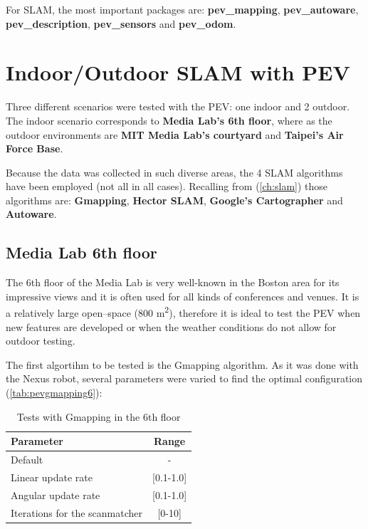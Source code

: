 For SLAM, the most important packages are: \textbf{pev\_mapping}, \textbf{pev\_autoware}, \textbf{pev\_description}, \textbf{pev\_sensors} and \textbf{pev\_odom}.

\section{Indoor/Outdoor SLAM with PEV}

Three different scenarios were tested with the PEV: one indoor and 2 outdoor. The indoor scenario corresponds to \textbf{Media Lab's 6th floor}, where as the outdoor environments are \textbf{MIT Media Lab's courtyard} and \textbf{Taipei's Air Force Base}.

Because the data was collected in such diverse areas, the 4 SLAM algorithms have been employed (not all in all cases). Recalling from (\autoref{ch:slam}) those algorithms are: \textbf{Gmapping}, \textbf{Hector SLAM}, \textbf{Google's Cartographer} and \textbf{Autoware}.

\subsection{Media Lab 6th floor}
The 6th floor of the Media Lab is very well-known in the Boston area for its impressive views and it is often used for all kinds of conferences and venues. It is a relatively large open--space (800 m\textsuperscript{2}), therefore it is ideal to test the PEV when new features are developed or when the weather conditions do not allow for outdoor testing.

The first algortihm to be tested is the Gmapping algorithm. As it was done with the Nexus robot, several parameters were varied to find the optimal configuration (\autoref{tab:pevgmapping6}):
\begin{table}[h]
  \centering
  \begin{tabular}{lc}
  \hline
  \textbf{Parameter} & \textbf{Range} \\ \hline
  Default & - \\ \hline
  Linear update rate & {[}0.1-1.0{]} \\ \hline
  Angular update rate & {[}0.1-1.0{]} \\ \hline
  Iterations for the scanmatcher & {[}0-10{]} \\ \hline
  \end{tabular}
  \caption{Tests with Gmapping in the 6th floor}
  \label{tab:pevgmapping6}
\end{table}

